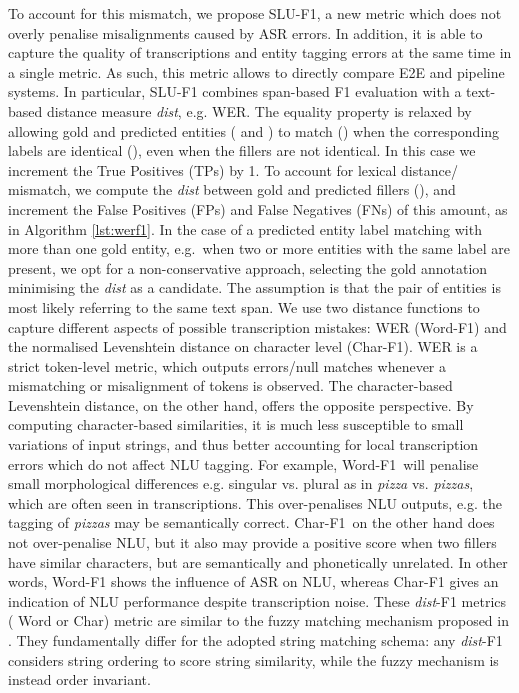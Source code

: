 \documentclass[11pt,a4paper]{article}
\newcommand{\metricname}{SLU-F1}
\newcommand{\werm}{Word-F1}
\newcommand{\levm}{Char-F1}
\newcommand{\etoe}{E2E}
\newcommand{\asr}{ASR}
\newcommand{\nlu}{NLU}
\newcommand{\wer}{WER}
\newcommand{\tp}{TPs}
\newcommand{\fp}{FPs}
\newcommand{\fn}{FNs}
\begin{document}
To account for this mismatch, we propose \metricname, a new metric which does not  overly penalise misalignments caused by \asr{} errors. In addition, it is able to capture the quality of transcriptions and entity tagging errors at the same time in a single metric. As such, this  metric allows to directly compare \etoe{}  and pipeline systems. In particular, \metricname{} combines span-based F1 evaluation with a text-based distance measure \textit{dist}, e.g. \wer. The equality property  is  relaxed by allowing gold and predicted entities ( and ) to match () when the corresponding labels are identical (), even when the fillers are not identical. In this case we increment the True Positives (\tp) by 1. To account for lexical distance/ mismatch, we compute the \textit{dist} between gold and predicted fillers (), and increment the False Positives (\fp) and False Negatives (\fn) of this amount, as in Algorithm \ref{lst:werf1}. In the case of a predicted entity label  matching with more than one gold entity, e.g.\ when two or more entities with the same label are present, we opt for a non-conservative approach, selecting the gold annotation minimising the \textit{dist} as a candidate. The assumption is that the pair of entities is most likely referring to the same text span. We use two distance functions to capture different aspects of possible transcription mistakes:  \wer{} (\werm) and the normalised Levenshtein distance on character level (\levm). \wer{} is a strict token-level metric, which outputs errors/null matches whenever a mismatching or misalignment of tokens is observed. 
The character-based Levenshtein distance, on the other hand, offers the opposite perspective. By computing character-based similarities, it is much less susceptible to small variations of input strings, and thus better accounting for local transcription errors which do not affect \nlu{} tagging.
For example, \werm ~will penalise small morphological differences e.g. singular vs. plural as in \textit{pizza} vs. \textit{pizzas}, which are often seen in transcriptions. This  over-penalises \nlu{} outputs, e.g. the tagging of \textit{pizzas} may be semantically correct. \levm ~on the other hand does not over-penalise \nlu, but it also may provide a positive score when two fillers have similar characters, but are semantically and phonetically unrelated.
In other words, \werm{} shows the influence of \asr{} on \nlu, whereas \levm{} gives an indication of \nlu{} performance despite transcription noise.
These \textit{dist}-F1 metrics ( Word or Char) metric are similar to the fuzzy matching mechanism proposed in \cite{48919}. They fundamentally differ for the adopted string matching schema: any \textit{dist}-F1 considers string ordering to score string similarity, while the fuzzy mechanism is instead order invariant.
\end{document}
